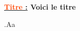 \documentclass[a4paper, 12pt, twoside]{article}
\renewcommand{\emph}{\textcolor{ff4500}}
\newcommand{\ind}[1][20pt]{\advance\leftskip + #1}
\newcommand{\thetitle}[2]{\begin{center}\textbf{{\Large \underline{\emph{#1} :}} {\large #2}}\end{center}}
\newcommand{\mainpart}[2]{\underline{\large \textbf{\emph{\textit{#1)} #2}}}}
\newcommand{\subpart}[2]{.\underline{\bf \textit{#1)} #2}}
\newcommand{\subsubpart}[2]{.\underline{\sl #1) #2}}
\begin{document}
    \thetitle{Titre}{Voici le titre}
    
    
%     
%     	

    
    .Aa
    
\end{document}
